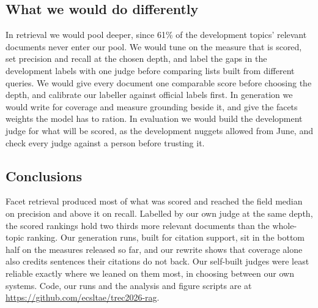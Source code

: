 \documentclass[sigconf,nonacm]{acmart}
\begin{document}
\subsection{What we would do differently}
In retrieval we would pool deeper, since 61\% of the development topics' relevant
documents never enter our pool. We would tune on the measure that is scored, set
precision and recall at the chosen depth, and label the gaps in the development
labels with one judge before comparing lists built from different queries. We would
give every document one comparable score before choosing the depth, and calibrate
our labeller against official labels first. In generation we would write for
coverage and measure grounding beside it, and give the facets weights the model has
to ration. In evaluation we would build the development judge for what will be
scored, as the development nuggets allowed from June, and check every judge against a
person before trusting it.

\subsection{Conclusions}
Facet retrieval produced most of what was scored and reached the field median on
precision and above it on recall. Labelled by our own judge at the same depth, the
scored rankings hold two thirds more relevant documents than the whole-topic
ranking.
Our generation runs, built for citation support, sit in the bottom half on the
measures released so far, and our rewrite shows that coverage alone also credits
sentences their citations do not back. Our self-built judges were least reliable
exactly where we leaned on them most, in choosing between our own systems. Code,
our runs and the analysis and figure scripts are at
\url{https://github.com/ecsltae/trec2026-rag}.



\end{document}
